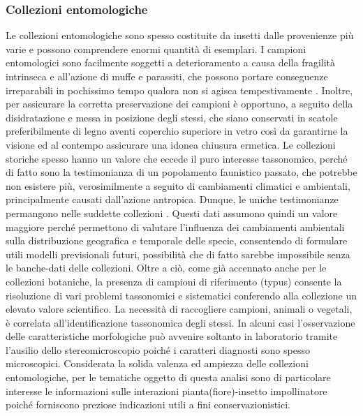 \documentclass[main.tex]{subfiles}
\begin{document}
\subsubsection{Collezioni entomologiche}

Le collezioni entomologiche sono spesso costituite da insetti dalle provenienze più varie e possono comprendere enormi quantità di esemplari. I campioni entomologici sono facilmente soggetti a deterioramento a causa della fragilità intrinseca e all’azione di muffe e parassiti, che possono portare conseguenze irreparabili in pochissimo tempo qualora non si agisca tempestivamente \citep{barto}. Inoltre, per assicurare la corretta preservazione dei campioni è opportuno, a seguito della disidratazione e messa in posizione degli stessi, che siano conservati in scatole preferibilmente di legno aventi coperchio superiore in vetro così da garantirne la visione ed al contempo assicurare una idonea chiusura ermetica.
Le collezioni storiche spesso hanno un valore che eccede il puro interesse tassonomico, perché di fatto sono la testimonianza di un popolamento faunistico passato, che potrebbe non esistere più, verosimilmente a seguito di cambiamenti climatici e ambientali, principalmente causati dall’azione antropica. Dunque, le uniche testimonianze permangono nelle suddette collezioni \citep{mone}.
Questi dati assumono quindi un valore maggiore perché permettono di valutare l’influenza dei cambiamenti ambientali sulla distribuzione geografica e temporale delle specie, consentendo di formulare utili modelli previsionali futuri, possibilità che di fatto sarebbe impossibile senza le banche-dati delle collezioni. Oltre a ciò, come già accennato anche per le collezioni botaniche, la presenza di campioni di riferimento (typus) consente la risoluzione di vari problemi tassonomici e sistematici conferendo alla collezione un elevato valore scientifico.
La necessità di raccogliere campioni, animali o vegetali, è correlata all’identificazione tassonomica degli stessi. In alcuni casi l’osservazione delle caratteristiche morfologiche può avvenire soltanto in laboratorio tramite l’ausilio dello stereomicroscopio poiché i caratteri diagnosti sono spesso microscopici.
Considerata la solida valenza ed ampiezza delle collezioni entomologiche, per le tematiche oggetto di questa analisi sono di particolare interesse le informazioni sulle interazioni pianta(fiore)-insetto impollinatore poiché forniscono preziose indicazioni utili a fini conservazionistici.
\end{document}

